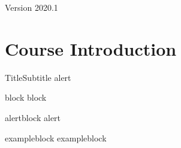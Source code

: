 \documentclass{beamer}
\subtitle[Intro]{Topic 00 - Course Introduction}
\begin{document}
\begin{frame}
  \maketitle

  \vfill

  \hfill Version 2020.1
\end{frame}

\section{Course Introduction}

\begin{frame}{Title}{Subtitle}
   \alert{alert}
  \begin{block}{block}
    block
  \end{block}
  \begin{alertblock}{alertblock}
    alert
  \end{alertblock}
  \begin{exampleblock}{exampleblock}
    exampleblock
  \end{exampleblock}
\end{frame}


\end{document}
